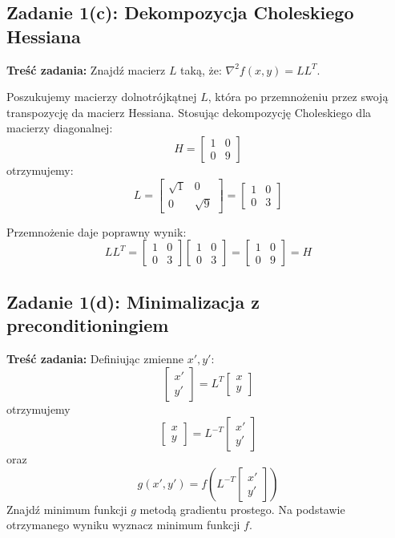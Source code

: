 \documentclass[12pt, a4paper]{article}
\begin{document}
\subsection{Zadanie 1(c): Dekompozycja Choleskiego Hessiana}

\textbf{Treść zadania:} Znajdź macierz $L$ taką, że: $\nabla^2 f(x, y) = L L^T$.

Poszukujemy macierzy dolnotrójkątnej $L$, która po przemnożeniu przez swoją transpozycję da macierz Hessiana. Stosując dekompozycję Choleskiego dla macierzy diagonalnej:
\[
  H = \begin{bmatrix} 1 & 0 \\ 0 & 9 \end{bmatrix}
\]
otrzymujemy:
\[
  L = \begin{bmatrix} \sqrt{1} & 0 \\ 0 & \sqrt{9} \end{bmatrix} = \begin{bmatrix} 1 & 0 \\ 0 & 3 \end{bmatrix}
\]

Przemnożenie daje poprawny wynik:
\[
  L L^T = \begin{bmatrix} 1 & 0 \\ 0 & 3 \end{bmatrix} \begin{bmatrix} 1 & 0 \\ 0 & 3 \end{bmatrix} = \begin{bmatrix} 1 & 0 \\ 0 & 9 \end{bmatrix} = H
\]

\subsection{Zadanie 1(d): Minimalizacja z preconditioningiem}

\textbf{Treść zadania:} Definiując zmienne $x', y'$:
\[
  \begin{bmatrix} x' \\ y' \end{bmatrix} = L^T \begin{bmatrix} x \\ y \end{bmatrix}
\]
otrzymujemy
\[
  \begin{bmatrix} x \\ y \end{bmatrix} = L^{-T} \begin{bmatrix} x' \\ y' \end{bmatrix}
\]
oraz
\[
  g(x', y') = f\left( L^{-T} \begin{bmatrix} x' \\ y' \end{bmatrix} \right)
\]
Znajdź minimum funkcji $g$ metodą gradientu prostego. Na podstawie otrzymanego wyniku wyznacz minimum funkcji $f$.
\end{document}
